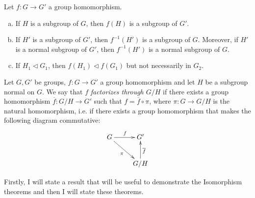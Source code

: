\documentclass[../main.tex]{subfiles}
\begin{document}
\begin{prop}
Let $f:G\rightarrow G'$ a group homomorphism.
\begin{enumerate}[(a)]
    \item If $H$ is a subgroup of $G$, then $f(H)$ is a subgroup of $G'$.
    \item If $H'$ is a subgroup of $G'$, then $f^{-1}(H')$ is a subgroup of $G$. Moreover, if $H'$ is a normal subgroup of $G'$, then $f^{-1}(H')$ is a normal subgroup of $G$.
    \item If $H_1\vartriangleleft G_1$, then $f(H_1)\vartriangleleft f(G_1)$ but not necessarily in $G_2$.
\end{enumerate}
\end{prop}



Let $G,G'$ be groups, $f:G\rightarrow G'$ a group homomorphism and let $H$ be a subgroup normal on $G$. We say that $f$ \textit{factorizes through $G/H$} if there exists a group homomorphism $\overline{f}:G/H\rightarrow G'$ such that $f = \overline{f}\circ \pi$, where $\pi:G\rightarrow G/H$ is the natural homomorphism, i.e. if there exists a group homomorphism that makes the following diagram commutative:
\begin{equation}
    \notag
    \xymatrix{
    G \ar[r]^f \ar[dr]_\pi & G' \\
    & G/H\ar[u]_{\overline{f}}
    }
\end{equation}

Firstly, I will state a result that will be useful to demonstrate the Isomorphism theorems and then I will state these theorems.
\end{document}
